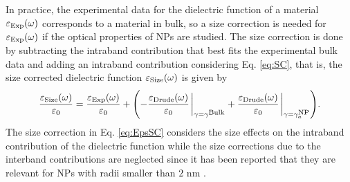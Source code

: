 In practice, the experimental data for the dielectric function of a material $\varepsilon_\text{\scriptsize Exp}(\omega)$ corresponds to a material in bulk, so a size  correction is needed for $\varepsilon_\text{\scriptsize Exp}(\omega)$ if the optical properties of NPs are studied. The size correction is done by subtracting the intraband  contribution that best fits the experimental bulk data and adding an intraband contribution considering Eq. \eqref{eq:SC}, that is, the size corrected dielectric function  $\varepsilon_\text{\scriptsize Size}(\omega)$ is given by
%
\begin{align}
\frac{\varepsilon_\text{\scriptsize Size}(\omega)}{\varepsilon_0} =
	\frac{\varepsilon_\text{\scriptsize Exp}(\omega)}{\varepsilon_0} +
 \qty(-
	 \frac{\varepsilon_\text{\scriptsize Drude}(\omega)}{\varepsilon_0}
	 									\eval_{\gamma = \gamma^\text{\scriptsize  Bulk}}
	 +
	 \frac{\varepsilon_\text{\scriptsize Drude}(\omega)}{\varepsilon_0}
 										\eval_{\gamma = \gamma^\text{\scriptsize  NP}_a} 	).
 \label{eq:EpsSC}
\end{align}
%
The size correction in Eq. \eqref{eq:EpsSC} considers the size effects on the intraband contribution of the dielectric function while the size corrections due to the interband contributions are neglected since it has been reported that they are relevant for NPs with radii smaller than $2$ nm \cite{mendoza_herrera_determination_2014}.

